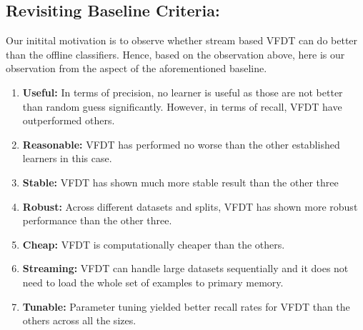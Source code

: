 \documentclass[sigplan]{acmart}\settopmatter{printfolios=true,printccs=false,printacmref=false}
\begin{document}
\subsection{Revisiting Baseline Criteria: }
Our initital motivation is to observe whether stream based VFDT can do better than the offline classifiers. Hence, based on the observation above, here is our observation from the aspect of the aforementioned baseline.
\begin{enumerate}
	\item \textbf{Useful: } In terms of precision, no learner is useful as those are not better than random guess significantly. However, in terms of recall, VFDT have outperformed others.
	\item \textbf{Reasonable: } VFDT has performed no worse than the other established learners in this case.
	\item \textbf{Stable: } VFDT has shown much more stable result than the other three
	\item \textbf{Robust: } Across different datasets and splits, VFDT has shown more robust performance than the other three.
	\item \textbf{Cheap: } VFDT is computationally cheaper than the others.
	\item \textbf{Streaming: } VFDT can handle large datasets sequentially and it does not need to load the whole set of examples to primary memory.
	\item \textbf{Tunable: } Parameter tuning yielded better recall rates for VFDT than the others across all the sizes.
\end{enumerate}
\end{document}
